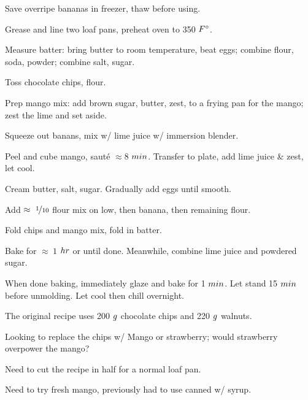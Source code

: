 \begin{preparation}
\item Save overripe bananas in freezer, thaw before using.

\item Grease and line two loaf pans, preheat oven to 350 $\Fahrenheit$.

\item Measure batter: bring butter to room temperature, beat eggs; combine flour, soda, powder; combine salt, sugar.

\item Toss chocolate chips, flour.

\item Prep mango mix: add brown sugar, butter, zest, to a frying pan for the mango;
	zest the lime and set aside.

\item Squeeze out banans, mix w/ lime juice w/ immersion blender.

\item Peel and cube mango, saut\'{e} $\approx 8$ $\minute$.
	Transfer to plate, add lime juice \& zest, let cool.

\item Cream butter, salt, sugar.
	Gradually add eggs until smooth.

\item Add $\approx~\onetenth$ flour mix on low, then banana, then remaining flour.

\item Fold chips and mango mix, fold in batter.

\item Bake for $\approx~1$ $\hour$ or until done.
	Meanwhile, combine lime juice and powdered sugar.

\item When done baking, immediately glaze and bake for 1 $\minute$.
	Let stand 15 $\minute$ before unmolding.
	Let cool then chill overnight.
\end{preparation}

\begin{variation}
\item The original recipe uses 200 $\gram$ chocolate chips and 220 $\gram$ walnuts.
\end{variation}


\begin{experiments}
\item Looking to replace the chips w/ Mango or strawberry; would strawberry overpower the mango?
\item Need to cut the recipe in half for a normal loaf pan.
\item Need to try fresh mango, previously had to use canned w/ syrup.
\end{experiments}


\recipeend
